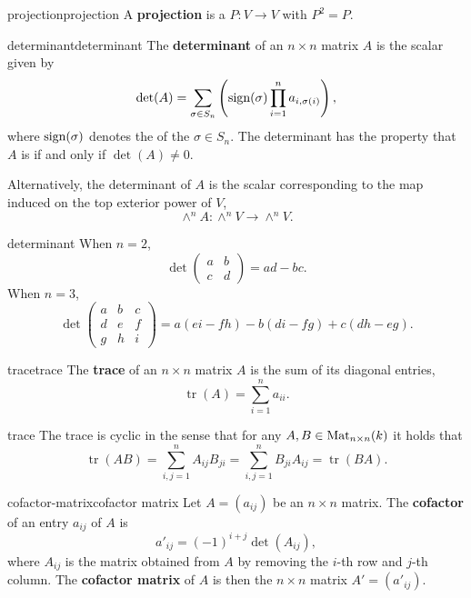 \begin{topic}{projection}{projection}
    A \textbf{projection} is a  $P : V \to V$ with $P^2 = P$.
\end{topic}

\begin{topic}{determinant}{determinant}
    The \textbf{determinant} of an $n \times n$ matrix $A$ is the scalar given by
    \[ \det(A) = \sum_{\sigma \in S_n} \left( \textup{sign}(\sigma) \prod_{i = 1}^{n} a_{i, \sigma(i)} \right) , \]
    where $\textup{sign}(\sigma)$ denotes the  of the  $\sigma \in S_n$. The determinant has the property that $A$ is  if and only if $\det(A) \ne 0$.
    
    Alternatively, the determinant of $A$ is the scalar corresponding to the map induced on the top exterior power of $V$,
    \[ \wedge^n A : \wedge^n V \to \wedge^n V . \]
\end{topic}

\begin{example}{determinant}
    When $n = 2$,
    \[ \det \begin{pmatrix} a & b \\ c & d \end{pmatrix} = ad - bc . \]
    When $n = 3$,
    \[ \det \begin{pmatrix} a & b & c \\ d & e & f \\ g & h & i \end{pmatrix} = a(ei - fh) - b(di - fg) + c(dh - eg) . \]
\end{example}

\begin{topic}{trace}{trace}
    The \textbf{trace} of an $n \times n$ matrix $A$ is the sum of its diagonal entries,
    \[ \operatorname{tr}(A) = \sum_{i = 1}^{n} a_{ii} . \]
\end{topic}

\begin{example}{trace}
    The trace is cyclic in the sense that for any $A, B \in \textup{Mat}_{n \times n}(k)$ it holds that
    \[ \operatorname{tr}(AB) = \sum_{i, j = 1}^{n} A_{ij} B_{ji} = \sum_{i, j = 1}^{n} B_{ji} A_{ij} = \operatorname{tr}(BA) . \]
\end{example}

\begin{topic}{cofactor-matrix}{cofactor matrix}
    Let $A = (a_{ij})$ be an $n \times n$ matrix. The \textbf{cofactor} of an entry $a_{ij}$ of $A$ is
    \[ a'_{ij} = (-1)^{i + j} \det(A_{ij}), \]
    where $A_{ij}$ is the matrix obtained from $A$ by removing the $i$-th row and $j$-th column. The \textbf{cofactor matrix} of $A$ is then the $n \times n$ matrix $A' = (a'_{ij})$.
\end{topic}

